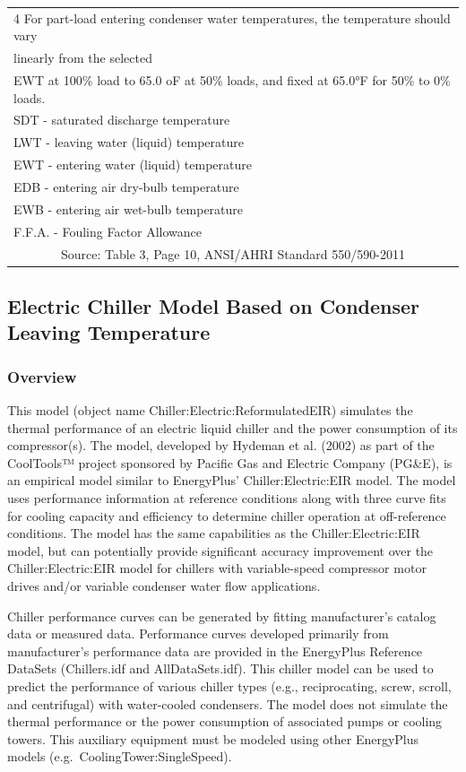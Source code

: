 \begin{longtable}[c]{p{1.2in}p{1.2in}p{1.2in}p{1.2in}p{1.2in}}
\multicolumn{5}{l}{4 For part-load entering condenser water temperatures, the temperature should vary} \tabularnewline
\multicolumn{5}{l}{linearly from  the selected} \tabularnewline
\multicolumn{5}{l}{EWT at 100\% load to 65.0 oF at 50\% loads, and fixed at 65.0°F for 50\% to 0\% loads.} \tabularnewline
\multicolumn{5}{l}{SDT - saturated discharge temperature} \tabularnewline
\multicolumn{5}{l}{LWT - leaving water (liquid) temperature} \tabularnewline
\multicolumn{5}{l}{EWT - entering water (liquid) temperature} \tabularnewline
\multicolumn{5}{l}{EDB - entering air dry-bulb temperature} \tabularnewline
\multicolumn{5}{l}{EWB - entering air wet-bulb temperature} \tabularnewline
\multicolumn{5}{l}{F.F.A. - Fouling Factor Allowance} \tabularnewline
\multicolumn{5}{c}{\scriptsize Source: Table 3, Page 10, ANSI/AHRI Standard 550/590-2011}
\end{longtable}

\subsection{Electric Chiller Model Based on Condenser Leaving Temperature}\label{electric-chiller-model-based-on-condenser-leaving-temperature}

\subsubsection{Overview}\label{overview-3-002}

This model (object name Chiller:Electric:ReformulatedEIR) simulates the thermal performance of an electric liquid chiller and the power consumption of its compressor(s). The model, developed by Hydeman et al. (2002) as part of the CoolTools™ project sponsored by Pacific Gas and Electric Company (PG\&E), is an empirical model similar to EnergyPlus' Chiller:Electric:EIR model. The model uses performance information at reference conditions along with three curve fits for cooling capacity and efficiency to determine chiller operation at off-reference conditions. The model has the same capabilities as the Chiller:Electric:EIR model, but can potentially provide significant accuracy improvement over the Chiller:Electric:EIR model for chillers with variable-speed compressor motor drives and/or variable condenser water flow applications.

Chiller performance curves can be generated by fitting manufacturer's catalog data or measured data. Performance curves developed primarily from manufacturer's performance data are provided in the EnergyPlus Reference DataSets (Chillers.idf and AllDataSets.idf). This chiller model can be used to predict the performance of various chiller types (e.g., reciprocating, screw, scroll, and centrifugal) with water-cooled condensers. The model does not simulate the thermal performance or the power consumption of associated pumps or cooling towers. This auxiliary equipment must be modeled using other EnergyPlus models (e.g.~CoolingTower:SingleSpeed).

